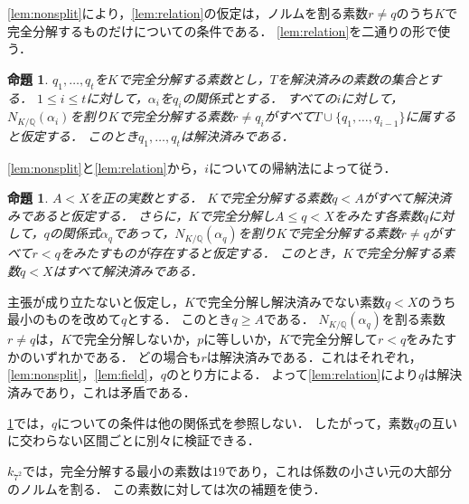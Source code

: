\documentclass[11pt,a4paper]{ltjsarticle}
\makeatletter
\theoremstyle{ja}
\newtheorem{proposition}[theorem]{命題}
\renewenvironment{proof}[1][証明]{\par
  \pushQED{\qed}\normalfont \topsep6\p@\@plus6\p@\relax
  \trivlist
  \item[\hskip\labelsep\bfseries #1]\hspace{1\zw}\ignorespaces
}{\popQED\endtrivlist\@endpefalse}
\makeatother
\begin{document}
\cref{lem:nonsplit}により，\cref{lem:relation}の仮定は，ノルムを割る素数$r \ne q$のうち$K$で完全分解するものだけについての条件である．
\cref{lem:relation}を二通りの形で使う．

\begin{proposition} \label{prop:list}
$q_1, \ldots, q_t$を$K$で完全分解する素数とし，$T$を解決済みの素数の集合とする．
$1 \le i \le t$に対して，$\alpha_i$を$q_i$の関係式とする．
すべての$i$に対して，$N_{K/\mathbb{Q}}(\alpha_i)$を割り$K$で完全分解する素数$r \ne q_i$がすべて$T \cup \{q_1, \ldots, q_{i-1}\}$に属すると仮定する．
このとき$q_1, \ldots, q_t$は解決済みである．
\end{proposition}

\begin{proof}
\cref{lem:nonsplit}と\cref{lem:relation}から，$i$についての帰納法によって従う．
\end{proof}

\begin{proposition} \label{prop:range}
$A < X$を正の実数とする．
$K$で完全分解する素数$q < A$がすべて解決済みであると仮定する．
さらに，$K$で完全分解し$A \le q < X$をみたす各素数$q$に対して，$q$の関係式$\alpha_q$であって，$N_{K/\mathbb{Q}}(\alpha_q)$を割り$K$で完全分解する素数$r \ne q$がすべて$r < q$をみたすものが存在すると仮定する．
このとき，$K$で完全分解する素数$q < X$はすべて解決済みである．
\end{proposition}

\begin{proof}
主張が成り立たないと仮定し，$K$で完全分解し解決済みでない素数$q < X$のうち最小のものを改めて$q$とする．
このとき$q \ge A$である．
$N_{K/\mathbb{Q}}(\alpha_q)$を割る素数$r \ne q$は，$K$で完全分解しないか，$p$に等しいか，$K$で完全分解して$r < q$をみたすかのいずれかである．
どの場合も$r$は解決済みである．これはそれぞれ，\cref{lem:nonsplit}，\cref{lem:field}，$q$のとり方による．
よって\cref{lem:relation}により$q$は解決済みであり，これは矛盾である．
\end{proof}

\cref{prop:range}では，$q$についての条件は他の関係式を参照しない．
したがって，素数$q$の互いに交わらない区間ごとに別々に検証できる．

$k_{7^2}$では，完全分解する最小の素数は$19$であり，これは係数の小さい元の大部分のノルムを割る．
この素数に対しては次の補題を使う．
\end{document}
